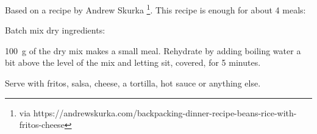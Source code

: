 
Based on a recipe by Andrew Skurka \footnote{via https://andrewskurka.com/backpacking-dinner-recipe-beans-rice-with-fritos-cheese}. This recipe is enough for about 4 meals:


Batch mix dry ingredients:

\begin{ingredients}
\end{ingredients}

\SI{100}{g} of the dry mix makes a small meal. Rehydrate by adding boiling water a bit above the level of the mix and letting sit, covered, for 5 minutes.

Serve with fritos, salsa, cheese, a tortilla, hot sauce or anything else.
